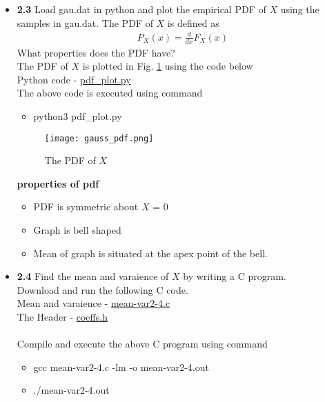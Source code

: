 \documentclass[journal,12pt,twocolumn]{IEEEtran}
\begin{document}
\begin{itemize}
    \item \textbf{2.3} Load gau.dat in python and plot the empirical PDF of $X$ using the samples in gau.dat. The PDF of $X$ is defined as 
    \begin{align}
        P_X(x) = \frac{d}{dx} F_X(x)
    \end{align}
    What properties does the PDF have? \\
    \solution The PDF of $X$ is plotted in Fig. \ref{fig:gauss_pdf}
    using the code below \\
    Python code - \href{https://github.com/jarpula-Bhanu/Random-numbers/blob/main/codes/pdf_plot.py}{pdf\_plot.py}\\
    The above code is executed using command
    \begin{itemize}
        \item python3 pdf\_plot.py \\
    \end{itemize}
    \begin{figure}[h]
        \centering
        \texttt{[image: gauss\_pdf.png]}
        \caption{The PDF of $X$}
        \label{fig:gauss_pdf}
    \end{figure}
    
    \textbf{properties of pdf}
    \begin{itemize}
        \item PDF is symmetric about $X$ = 0 
        \item Graph is bell shaped
        \item Mean of graph is situated at the apex point of the bell.\\
    \end{itemize}
    
    \item \textbf{2.4} Find the mean and varaience of $X$ by writing a C program.\\
     
    \solution Download and run the following C code.\\
    Mean and varaience - \href{https://github.com/jarpula-Bhanu/Random-numbers/blob/main/codes/mean-var2-4.c}{mean-var2-4.c}\\
    The Header - \href{https://github.com/jarpula-Bhanu/Random-numbers/blob/main/codes/coeffs.h}{coeffs.h} \\
    \\Compile and execute the above C program using command
    \begin{itemize}
        \item gcc mean-var2-4.c -lm -o mean-var2-4.out
        \item ./mean-var2-4.out \\
    \end{itemize} 


\end{itemize}
\end{document}
